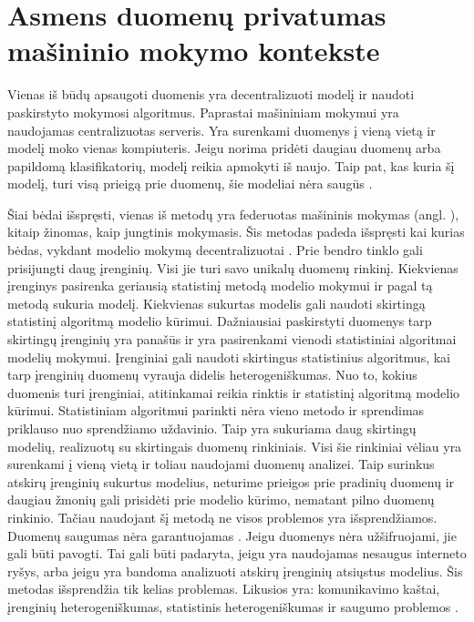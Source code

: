 \documentclass{VUMIFInfBakalaurinis}
\begin{document}
\section{Asmens duomenų privatumas mašininio mokymo kontekste}
	\par Vienas iš būdų apsaugoti duomenis yra decentralizuoti modelį ir naudoti paskirstyto mokymosi algoritmus. Paprastai mašininiam mokymui yra naudojamas centralizuotas serveris. Yra surenkami duomenys į vieną vietą ir modelį moko vienas kompiuteris. Jeigu norima pridėti daugiau duomenų arba papildomą klasifikatorių, modelį reikia apmokyti iš naujo. Taip pat, kas kuria šį modelį, turi visą prieigą prie duomenų, šie modeliai nėra saugūs \cite{13}. 
	\par Šiai bėdai išspręsti, vienas iš metodų yra federuotas mašininis mokymas (angl. ), kitaip žinomas, kaip jungtinis mokymasis. Šis metodas padeda išspręsti kai kurias bėdas, vykdant modelio mokymą decentralizuotai \cite{3}. Prie bendro tinklo gali prisijungti daug įrenginių. Visi jie turi savo unikalų duomenų rinkinį. Kiekvienas įrenginys pasirenka geriausią statistinį metodą modelio mokymui ir pagal tą metodą sukuria modelį. Kiekvienas sukurtas modelis gali naudoti skirtingą statistinį algoritmą modelio kūrimui. Dažniausiai paskirstyti duomenys tarp skirtingų įrenginių yra panašūs ir yra pasirenkami vienodi statistiniai algoritmai modelių mokymui. Įrenginiai gali naudoti skirtingus statistinius algoritmus, kai tarp įrenginių duomenų vyrauja didelis heterogeniškumas. Nuo to, kokius duomenis turi įrenginiai, atitinkamai reikia rinktis ir statistinį algoritmą modelio kūrimui. Statistiniam algoritmui parinkti nėra vieno metodo ir sprendimas priklauso nuo sprendžiamo uždavinio. Taip yra sukuriama daug skirtingų modelių, realizuotų su skirtingais duomenų rinkiniais. Visi šie rinkiniai vėliau yra surenkami į vieną vietą ir toliau naudojami duomenų analizei. Taip surinkus atskirų įrenginių sukurtus modelius, neturime prieigos prie pradinių duomenų ir daugiau žmonių gali prisidėti prie modelio kūrimo, nematant pilno duomenų rinkinio. Tačiau naudojant šį metodą ne visos problemos yra išsprendžiamos. Duomenų saugumas nėra garantuojamas \cite{3}. Jeigu duomenys nėra užšifruojami, jie gali būti pavogti. Tai gali būti padaryta, jeigu yra naudojamas nesaugus interneto ryšys, arba jeigu yra bandoma analizuoti atskirų įrenginių atsiųstus modelius. Šis metodas išsprendžia tik kelias problemas. Likusios yra: komunikavimo kaštai, įrenginių heterogeniškumas, statistinis heterogeniškumas ir saugumo problemos \cite{4}.
\end{document}
